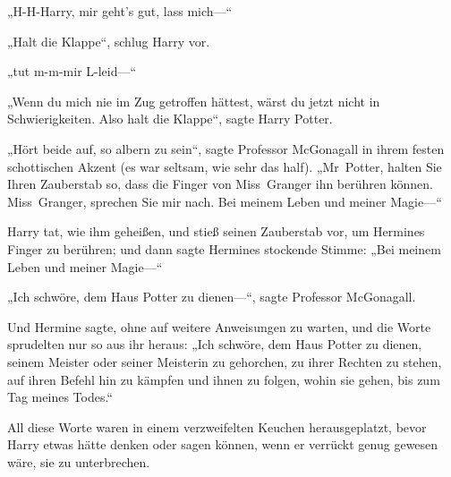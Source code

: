„H-H-Harry, mir geht’s gut, lass mich—“

„Halt die Klappe“, schlug Harry vor.

„tut m-m-mir L-leid—“

„Wenn du mich nie im Zug getroffen hättest, wärst du jetzt nicht in Schwierigkeiten. Also halt die Klappe“, sagte Harry Potter.

„Hört beide auf, so albern zu sein“, sagte Professor McGonagall in ihrem festen schottischen Akzent (es war seltsam, wie sehr das half). „Mr~Potter, halten Sie Ihren Zauberstab so, dass die Finger von Miss~Granger ihn berühren können. Miss~Granger, sprechen Sie mir nach. Bei meinem Leben und meiner Magie—“

Harry tat, wie ihm geheißen, und stieß seinen Zauberstab vor, um Hermines Finger zu berühren; und dann sagte Hermines stockende Stimme:
„Bei meinem Leben und meiner Magie—“

„Ich schwöre, dem Haus Potter zu dienen—“, sagte Professor McGonagall.

Und Hermine sagte, ohne auf weitere Anweisungen zu warten, und die Worte sprudelten nur so aus ihr heraus:
„Ich schwöre, dem Haus Potter zu dienen, seinem Meister oder seiner Meisterin zu gehorchen, zu ihrer Rechten zu stehen, auf ihren Befehl hin zu kämpfen und ihnen zu folgen, wohin sie gehen, bis zum Tag meines Todes.“

All diese Worte waren in einem verzweifelten Keuchen herausgeplatzt, bevor Harry etwas hätte denken oder sagen können, wenn er verrückt genug gewesen wäre, sie zu unterbrechen.

